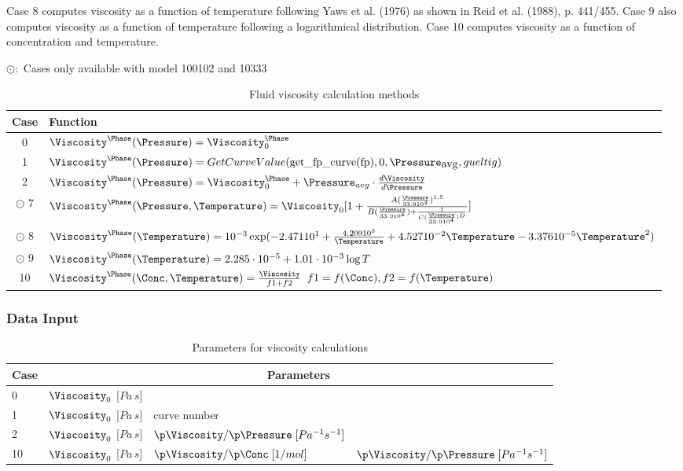 Case 8 computes viscosity as a function of temperature following
Yaws et al. (1976) as shown in Reid et al. (1988), p. 441/455.
Case 9 also computes viscosity as a function of temperature
following a logarithmical distribution.  Case 10 computes
viscosity as a function of concentration and temperature.

\bigskip
\begin{table}[!h]
\centering \caption{Fluid viscosity calculation
methods}
$\odot:$ Cases only available with model 100102 and 10333
\begin{tabular}{|c|p{10cm}|}
\hline
\rule[-3mm]{0mm}{8mm}{\textbf{Case}} & \textbf{Function} \\
\hline
  0  &  $\Viscosity^\Phase(\Pressure)= \Viscosity_0^\Phase$
  \\[1mm]
  1  &  $\Viscosity^\Phase(\Pressure)= GetCurveValue (\mbox{get\_fp\_curve(fp)},
  0, \Pressure_{\mbox{avg}}, gueltig)$
  \\[1mm]
  2  &  $\Viscosity^\Phase(\Pressure)= \Viscosity_0^\Phase+
  \Pressure_{avg}\cdot\frac{d\Viscosity}{d\Pressure}$
  \\[1mm]
 $\odot$ 7 & $\Viscosity^\Phase(\Pressure,\Temperature)= \Viscosity_0 [1
+ \frac{A(\frac{\Pressure}{33.9
10^4})^{1.5}}{B(\frac{\Pressure}{33.9 10^4}) +
\frac{1}{C(\frac{\Pressure}{33.9 10^4})^D}}]$
 \\
$\odot$ 8 & $\Viscosity^\Phase(\Temperature) = 10^{-3} \exp(-2.471 10^1+\frac{4.209 10^3}{\Temperature}
+4.527 10^{-2}\Temperature-3.376 10^{-5}\Temperature^2)$
\\
$\odot$ 9 & $\Viscosity^\Phase(\Temperature) = 2.285\cdot10^{-5} + 1.01 \cdot10^{-3}\log{T}$
\\
  10 & $\Viscosity^\Phase(\Conc,\Temperature) =
  \frac{\Viscosity}{f1 + f2}$ $ f1= f(\Conc), f2=f(\Temperature)$
  \\
  \hline
\end{tabular}
 \label{Fluid viscosity
methods}
\end{table}

\subsubsection*{Data Input}

\begin{table}[h]
\begin{tabular}{|l|lll|}
\hline
\rule[-3mm]{0mm}{8mm}\textbf{Case} & \multicolumn{3}{|c|}{\textbf{Parameters}}\\
\hline
0 & $\Viscosity_0$ [$Pa\,s]$&&\\
1 & $\Viscosity_0$ [$Pa\,s]$& curve number &\\
2 & $\Viscosity_0$ [$Pa\,s]$ & $\p\Viscosity/\p\Pressure \;[Pa^{-1}s^{-1}]$&\\
10 & $\Viscosity_0$ [$Pa\,s]$ & $\p\Viscosity/\p\Conc \;[1/mol] $&$\p\Viscosity/\p\Pressure \;[Pa^{-1}s^{-1}]$\\
\hline
\end{tabular}
\label{table:density parameters}\caption{Parameters for viscosity
calculations}
\end{table}


